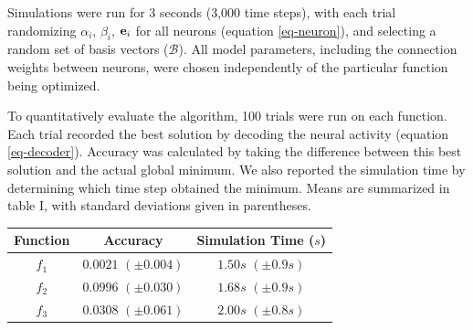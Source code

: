 \documentclass[letterpaper, 10 pt, conference]{ieeeconf}  %
\newcommand{\bolds}[1]{{\bf #1}}
\begin{document}
Simulations were run for 3 seconds (3,000 time steps), with each trial randomizing $\alpha_i$, $\beta_i$, $\bolds{e}_i$ for all neurons (equation \ref{eq-neuron}), and selecting a random set of basis vectors ($\mathcal{B}$). All model parameters, including the connection weights between neurons, were chosen independently of the particular function being optimized.

To quantitatively evaluate the algorithm, 100 trials were run on each function. Each trial recorded the best solution by decoding the neural activity (equation \ref{eq-decoder}). Accuracy was calculated by taking the difference between this best solution and the actual global minimum. We also reported the simulation time by determining which time step obtained the minimum. Means are summarized in table I, with standard deviations given in parentheses.

\begin{table}[h] \label{table-perf}
\begin{center}
\begin{tabular}{|c|c|c|}
\hline
Function & Accuracy & Simulation Time ($s$) \\
\hline
$f_1$ & $0.0021$ $(\pm0.004)$ & $1.50s$ $(\pm0.9s)$ \\
$f_2$ & $0.0996$ $(\pm0.030)$ & $1.68s$ $(\pm0.9s)$ \\
$f_3$ & $0.0308$ $(\pm0.061)$ & $2.00s$ $(\pm0.8s)$ \\
\hline
\end{tabular}
\end{center}
\end{table}

\end{document}
